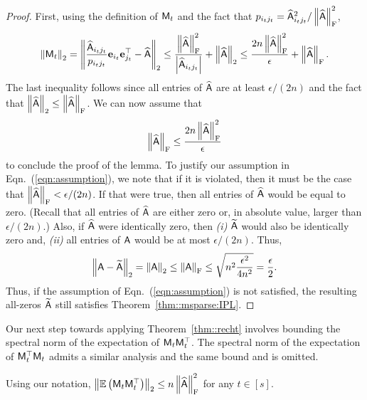 \begin{proof}
%
First, using the definition of ${\mathsf{M} }_t$ and the fact that $p_{i_t j_t} = \widehat{{\mathsf{A} }}_{i_tj_t}^2/\left\|\widehat{{\mathsf{A} }}\right\|_{\textrm{F}}^2$,
%
$$\left\|{\mathsf{M} }_t\right\|_2 = \left\|\frac{\widehat{{\mathsf{A} }}_{i_t j_t}}{p_{i_t j_t}} {\mathbf e}_{i_t}{\mathbf e}_{j_t}^\top - \widehat{{\mathsf{A} }}\right\|_2 \leq \frac{\left\|\widehat{{\mathsf{A} }}\right\|_{\textrm{F}}^2}{\left|\widehat{{\mathsf{A} }}_{i_tj_t}\right|}+\left\|\widehat{{\mathsf{A} }}\right\|_2 \leq \frac{2n\left\|\widehat{{\mathsf{A} }}\right\|_{\textrm{F}}^2}{\epsilon}+\left\|\widehat{{\mathsf{A} }}\right\|_{\textrm{F}}. $$
%
The last inequality follows since all entries of $\widehat{{\mathsf{A} }}$ are at least $\epsilon/(2n)$ and the fact that $\left\|\widehat{{\mathsf{A} }}\right\|_2 \leq \left\|\widehat{{\mathsf{A} }}\right\|_{\textrm{F}}$. We can now assume that
%
\begin{equation}\label{eqn:assumption}
\left\|\widehat{{\mathsf{A} }}\right\|_{\textrm{F}} \leq \frac{2n\left\|\widehat{{\mathsf{A} }}\right\|_{\textrm{F}}^2}{\epsilon}
\end{equation}
%
to conclude the proof of the lemma. To justify our assumption in Eqn.~(\ref{eqn:assumption}), we note that if it is violated, then it must be the case that $\left\|\widehat{{\mathsf{A} }}\right\|_{\textrm{F}} < \epsilon /(2n)$. If that were true, then all entries of $\widehat{{\mathsf{A} }}$ would be equal to zero. (Recall that all entries of $\widehat{{\mathsf{A} }}$ are either zero or, in absolute value, larger than $\epsilon/(2n)$.) Also, if $\widehat{{\mathsf{A} }}$ were identically zero, then \textit{(i)} $\widetilde{{\mathsf{A} }}$ would also be identically zero and, \textit{(ii)} all entries of ${\mathsf{A} }$ would be at most $\epsilon/(2n)$. Thus, $$\left\|{\mathsf{A} }-\widetilde{{\mathsf{A} }}\right\|_2 = \left\|{\mathsf{A} }\right\|_2 \leq \left\|{\mathsf{A} }\right\|_{\textrm{F}} \leq \sqrt{n^2 \frac{\epsilon^2}{4n^2}}=\frac{\epsilon}{2}.$$
%
Thus, if the assumption of Eqn.~(\ref{eqn:assumption}) is not satisfied, the resulting all-zeros $\widetilde{{\mathsf{A} }}$ still satisfies Theorem~\ref{thm::msparse:IPL}.
%
\end{proof}

\noindent Our next step towards applying Theorem~\ref{thm::recht} involves bounding the spectral norm of the expectation of ${\mathsf{M} }_t{\mathsf{M} }_t^\top$. The spectral norm of the expectation of ${\mathsf{M} }_t^\top{\ensuremath{\mathsf{M} }}_t$ admits a similar analysis and the same bound and is omitted.
%
\begin{lemma}\label{lem:lem3}
%
Using our notation, $\left\|\operatorname{\mathbb{E}}\left({\mathsf{M} }_t{\mathsf{M} }_t^\top\right)\right\|_2 \leq n\left\|\widehat{{\mathsf{A} }}\right\|_{\textrm{F}}^2$ for any $t \in [s]$.
%
\end{lemma}

